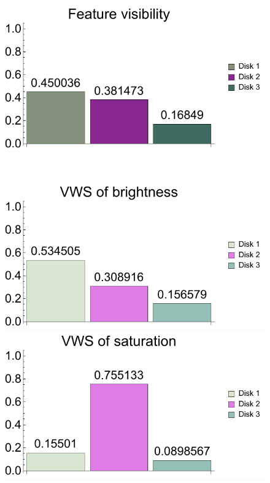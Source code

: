 \begin{figure}
	\centering
	\begin{minipage}{.45\textwidth}
		\includegraphics[width=1\linewidth]{figures/disk_visibility_chart_left}
		\subcaption{}
	\end{minipage}~
	\begin{minipage}{.45\textwidth}
		\includegraphics[width=1\linewidth]{figures/disk_visibility_saliency_brightness_chart_left}
		\subcaption{}
	\end{minipage}
	\begin{minipage}{.45\textwidth}
		\includegraphics[width=1\linewidth]{figures/disk_visibility_saliency_saturation_chart_left}

\end{minipage}
\end{figure}
